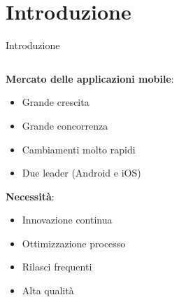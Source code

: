 
\section{Introduzione}

\begin{frame}{Introduzione}
    \begin{columns}[onlytextwidth]
            \begin{column}{0.5\textwidth}
            
            \textbf{Mercato delle applicazioni mobile}:
            \begin{itemize}
                \item Grande crescita
                \item Grande concorrenza
                \item Cambiamenti molto rapidi
                \item Due leader (Android e iOS)
            \end{itemize}
    
            \vspace{3mm}
    
            \textbf{Necessità}:
            \begin{itemize}
                \item Innovazione continua
                \item Ottimizzazione processo
                \item Rilasci frequenti
                \item Alta qualità
            \end{itemize}
            
        \end{column}
        \begin{column}{0.5\textwidth}
        

\end{column}
\end{columns}
\end{frame}
